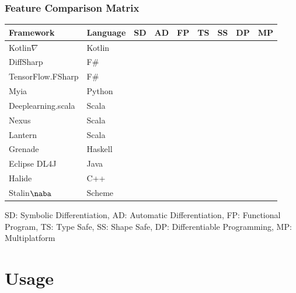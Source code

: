 \documentclass{beamer}
\newcommand{\wmark}{\textcolor{orange}{\ding{45}}}
\newcommand{\cmark}{\textcolor{green!80!black}{\ding{51}}}
\newcommand{\xmark}{\textcolor{red}{\ding{55}}}
\begin{document}
    \begin{frame}
        \frametitle{Feature Comparison Matrix}
            \begin{center}
            \begin{tabular}{lllllllll}
            \textbf{Framework} & \textbf{Language}  & SD     & AD     & FP     & TS     & SS     & DP     & MP     \\ \hline
            Kotlin$\nabla$     & Kotlin             & \cmark & \cmark & \cmark & \cmark & \cmark & \wmark & \wmark \\
            DiffSharp          & F\#                & \xmark & \cmark & \cmark & \cmark & \xmark & \cmark & \xmark \\
            TensorFlow.FSharp  & F\#                & \xmark & \cmark & \cmark & \cmark & \cmark & \cmark & \xmark \\
            Myia               & Python             & \cmark & \cmark & \cmark & \cmark & \cmark & \cmark & \xmark \\
            Deeplearning.scala & Scala              & \xmark & \cmark & \cmark & \cmark & \xmark & \cmark & \xmark \\
            Nexus              & Scala              & \xmark & \cmark & \cmark & \cmark & \cmark & \cmark & \xmark \\
            Lantern            & Scala              & \xmark & \cmark & \cmark & \cmark & \xmark & \cmark & \xmark \\
            Grenade            & Haskell            & \xmark & \cmark & \cmark & \cmark & \cmark & \xmark & \xmark \\
            Eclipse DL4J       & Java               & \xmark & \cmark & \xmark & \cmark & \xmark & \xmark & \xmark \\
            Halide             & C++                & \xmark & \cmark & \xmark & \cmark & \xmark & \cmark & \xmark \\
            Stalin$\naba$      & Scheme             & \xmark & \cmark & \cmark & \xmark & \xmark & \xmark & \xmark \\
        \end{tabular}
        \end{center}
        \footnotesize{SD: Symbolic Differentiation, AD: Automatic Differentiation, FP: Functional Program, TS: Type Safe, SS: Shape Safe, DP: Differentiable Programming, MP: Multiplatform}
    \end{frame}

    \section{Usage}
\end{document}
